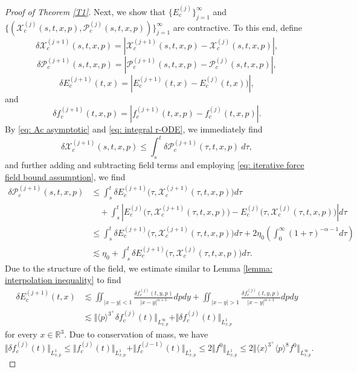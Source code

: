 \documentclass[reqno, 11pt, letterpaper]{amsart}
\theoremstyle{remark}
\numberwithin{equation}{section}
\numberwithin{theorem}{section}
\numberwithin{table}{section}
\numberwithin{figure}{section}
\begin{document}
\begin{proof}[Proof of Theorem \ref{T1}]
Next, we show that $\{E_c^{(j)}\}_{j=1}^\infty$ and $\{(\mathcal{X}_c^{(j)}(s,t, x,p), \mathcal{P}_c^{(j)}(s,t, x,p))\}_{j=1}^\infty$ are contractive.
To this end, define
$$\delta \mathcal{X}_c^{(j+1)}(s,t,x,p) = \left | \mathcal{X}_c^{(j+1)}(s,t,x,p) - \mathcal{X}_c^{(j)} (s,t,x,p) \right |,$$
$$\delta \mathcal{P}_c^{(j+1)}(s,t,x,p) = \left | \mathcal{P}_c^{(j+1)}(s,t,x,p) - \mathcal{P}_c^{(j)} (s,t,x,p) \right |,$$
$$\delta E_c^{(j+1)}(t,x) = \left | E_c^{(j+1)}(t, x) - E_c^{(j)}(t, x)) \right |,$$
and
$$\delta f_c^{(j+1)}(t,x,p) = \left | f_c^{(j+1)}(t,x,p) - f_c^{(j)}(t,x,p) \right |.$$
By \eqref{eq: Ac asymptotic} and \eqref{eq: integral r-ODE}, 
we immediately find
$$ \delta \mathcal{X}_c^{(j+1)}(s,t,x,p) \leq
\int_s^t \delta \mathcal{P}_c^{(j+1)}(\tau,t,x,p)\ d\tau,$$
and further adding and subtracting field terms and employing \eqref{eq: iterative force field bound assumption}, we find
$$\begin{aligned}
\delta \mathcal{P}_c^{(j+1)}(s,t,x,p)
& \leq 
\int_s^t \delta E_c^{(j+1)}\big(\tau, \mathcal{X}_c^{(j+1)} (\tau,t,x,p)\big) d\tau\\
& \quad + \int_s^t \left | E_c^{(j)}\big(\tau, \mathcal{X}_c^{(j+1)} (\tau,t,x,p)\big) - E_c^{(j)}\big(\tau, \mathcal{X}_c^{(j)} (\tau,t,x,p)\big) \right | d\tau\\
& \leq \int_s^t \delta E_c^{(j+1)}\big(\tau, \mathcal{X}_c^{(j+1)} (\tau,t,x,p)\big) d\tau + 2\eta_0  \left ( \int_0^\infty (1 + \tau)^{-\alpha - 1} d\tau \right )\\
& \lesssim \eta_0 + \int_s^t \delta E_c^{(j+1)}\big(\tau, \mathcal{X}_c^{(j)} (\tau,t,x,p)\big) d\tau.
\end{aligned}$$
Due to the structure of the field, we estimate similar to Lemma \ref{lemma: interpolation inequality} to find
$$\begin{aligned}
\delta E_c^{(j+1)}(t, x) & \lesssim \iint_{|x-y| < 1} \frac{\delta f_c^{(j)}(t,y,p)}{|x-y|^{\alpha+1}} dp dy + \iint_{|x-y| > 1} \frac{\delta f_c^{(j)}(t,y,p)}{|x-y|^{\alpha+1}} dp dy\\
& \lesssim \Vert \langle p \rangle^{3^+} \delta f_c^{(j)}(t) \Vert_{L^\infty_{x,p}} +  \Vert \delta f_c^{(j)}(t) \Vert_{L^1_{x,p}}
\end{aligned}$$
for every $x \in \mathbb{R}^3$. 
Due to conservation of mass, we have
$$ \Vert \delta f_c^{(j)}(t) \Vert_{L^1_{x,p}} \leq  \Vert f_c^{(j)}(t) \Vert_{L^1_{x,p}} +  \Vert f_c^{(j-1)}(t) \Vert_{L^1_{x,p}} \leq 2  \Vert f^0\Vert_{L^1_{x,p}} \leq  2\Vert \langle x \rangle^{3^+} \langle p \rangle^8 f^0 \Vert_{L^\infty_{x,p}}.$$

\end{proof}
\end{document}
